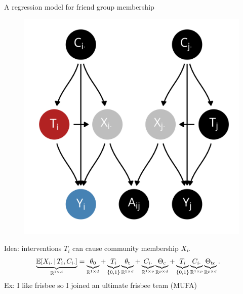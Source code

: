 \documentclass{beamer}
\theoremstyle{remark}
\begin{document}
\begin{frame}{A regression model for friend group membership}

    \centering

    \begin{figure}
        \includegraphics[scale=0.35]{figures/dags/homophily-mediating.png}
        \label{fig:homophily-mediating-again}
    \end{figure}
    Idea: interventions $T_i$ can cause community membership $X_{i \cdot}$
    \begin{align*}
        \underbrace{\E[T_i, \C_{i \cdot}]{\X_{i \cdot}}}_{\R^{1 \times d}}
         & = \underbrace{\thetazero}_{\R^{1 \times d}}
        + \underbrace{T_i}_{\{0, 1\}} \underbrace{\thetat}_{\R^{1 \times d}}
        + \underbrace{\C_{i \cdot}}_{\R^{1 \times p}} \underbrace{\Thetac}_{\R^{p \times d}}
        + \underbrace{T_i}_{\{0, 1\}} \underbrace{\C_{i \cdot}}_{\R^{1 \times p}} \underbrace{\Thetatc}_{\R^{p \times d}}.
    \end{align*}
    Ex: I like frisbee so I joined an ultimate frisbee team (MUFA)

\end{frame}
\end{document}

